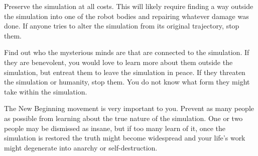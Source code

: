 \documentclass[char]{guildcamp1}
\begin{document}
\begin{itemz}[Goals]
  \item Preserve the simulation at all costs. This will likely require finding a way outside the simulation into one of the robot bodies and repairing whatever damage was done. If anyone tries to alter the simulation from its original trajectory, stop them.
  \item Find out who the mysterious minds are that are connected to the simulation. If they are benevolent, you would love to learn more about them outside the simulation, but entreat them to leave the simulation in peace. If they threaten the simulation or humanity, stop them. You do not know what form they might take within the simulation.
  \item The New Beginning movement is very important to you. Prevent as many people as possible from learning about the true nature of the simulation. One or two people may be dismissed as insane, but if too many learn of it, once the simulation is restored the truth might become widespread and your life's work might degenerate into anarchy or self-destruction.
\end{itemz}


  
\endtag



\end{document}
